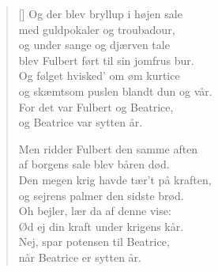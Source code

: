 \begin{multicols}{2}
\begin{verse}[\versewidth]
Og der blev bryllup i højen sale\\
med guldpokaler og troubadour,\\
og under sange og djærven tale\\
blev Fulbert ført til sin jomfrus bur.\\
Og følget hvisked' om øm kurtice\\
og skæmtsom puslen blandt dun og vår.\\
For det var Fulbert og Beatrice,\\
og Beatrice var sytten år.

Men ridder Fulbert den samme aften\\
af borgens sale blev båren død.\\
Den megen krig havde tær't på kraften,\\
og sejrens palmer den sidste brød.\\
Oh bejler, lær da af denne vise:\\
Ød ej din kraft under krigens kår.\\
Nej, spar potensen til Beatrice,\\
når Beatrice er sytten år.
\end{verse}
\end{multicols}

\renewcommand{\thepoem}{\standardpoem}

\newpage
\renewcommand{\thepage}{\standardpage}

\Fulberttrue

